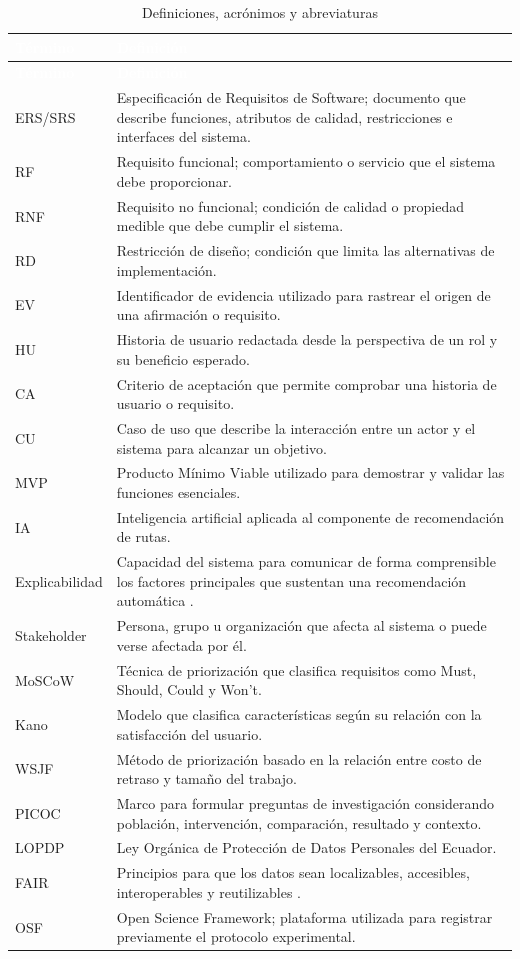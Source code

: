 \documentclass[12pt,a4paper]{article}
\begin{document}
\begin{longtable}{L{3.0cm} L{12.0cm}}
\caption{Definiciones, acrónimos y abreviaturas}\label{tab:glosario}\\
\textcolor{white}{\textbf{Término}} & \textcolor{white}{\textbf{Definición}}\\
\endfirsthead
{}
\textcolor{white}{\textbf{Término}} & \textcolor{white}{\textbf{Definición}}\\
\endhead
ERS/SRS & Especificación de Requisitos de Software; documento que describe funciones, atributos de calidad, restricciones e interfaces del sistema.\\
RF & Requisito funcional; comportamiento o servicio que el sistema debe proporcionar.\\
RNF & Requisito no funcional; condición de calidad o propiedad medible que debe cumplir el sistema.\\
RD & Restricción de diseño; condición que limita las alternativas de implementación.\\
EV & Identificador de evidencia utilizado para rastrear el origen de una afirmación o requisito.\\
HU & Historia de usuario redactada desde la perspectiva de un rol y su beneficio esperado.\\
CA & Criterio de aceptación que permite comprobar una historia de usuario o requisito.\\
CU & Caso de uso que describe la interacción entre un actor y el sistema para alcanzar un objetivo.\\
MVP & Producto Mínimo Viable utilizado para demostrar y validar las funciones esenciales.\\
IA & Inteligencia artificial aplicada al componente de recomendación de rutas.\\
Explicabilidad & Capacidad del sistema para comunicar de forma comprensible los factores principales que sustentan una recomendación automática \cite{chazette2020,chazette2021,chazette2022}.\\
Stakeholder & Persona, grupo u organización que afecta al sistema o puede verse afectada por él.\\
MoSCoW & Técnica de priorización que clasifica requisitos como Must, Should, Could y Won't.\\
Kano & Modelo que clasifica características según su relación con la satisfacción del usuario.\\
WSJF & Método de priorización basado en la relación entre costo de retraso y tamaño del trabajo.\\
PICOC & Marco para formular preguntas de investigación considerando población, intervención, comparación, resultado y contexto.\\
LOPDP & Ley Orgánica de Protección de Datos Personales del Ecuador.\\
FAIR & Principios para que los datos sean localizables, accesibles, interoperables y reutilizables \cite{wilkinson2016}.\\
OSF & Open Science Framework; plataforma utilizada para registrar previamente el protocolo experimental.\\
\end{longtable}
\end{document}
